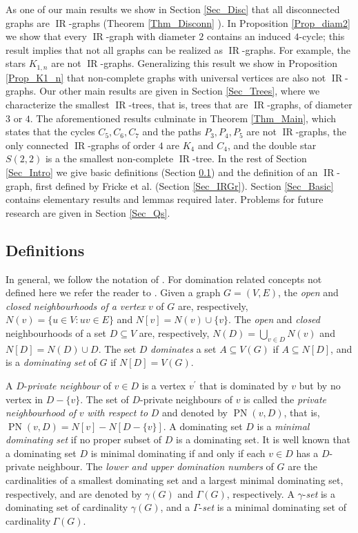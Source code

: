 \documentclass[12pt]{article}%
\begin{document}
As one of our main results we show in Section \ref{Sec_Disc} that all
disconnected graphs are $\operatorname{IR}$-graphs (Theorem \ref{Thm_Disconn}%
). In Proposition \ref{Prop_diam2} we show that every $\operatorname{IR}%
$-graph with diameter $2$ contains an induced $4$-cycle; this result implies
that not all graphs can be realized as $\operatorname{IR}$-graphs. For
example, the stars $K_{1,n}$ are not $\operatorname{IR}$-graphs. Generalizing
this result we show in Proposition \ref{Prop_K1_n} that non-complete graphs
with universal vertices are also not $\operatorname{IR}$-graphs. Our other
main results are given in Section \ref{Sec_Trees}, where we characterize the
smallest $\operatorname{IR}$-trees, that is, trees that are $\operatorname{IR}%
$-graphs, of diameter $3$ or $4$. The aforementioned results culminate in
Theorem \ref{Thm_Main}, which states that the cycles $C_{5},C_{6},C_{7}$ and
the paths $P_{3},P_{4},P_{5}$ are not $\operatorname{IR}$-graphs, the only
connected $\operatorname{IR}$-graphs of order $4$ are $K_{4}$ and $C_{4}$, and
the double star $S(2,2)$ is a the smallest non-complete $\operatorname{IR}%
$-tree. In the rest of Section \ref{Sec_Intro} we give basic definitions
(Section \ref{Sec_Defs}) and the definition of an $\operatorname{IR}$-graph,
first defined by Fricke et al. \cite{FHHH11} (Section \ref{Sec_IRGr}). Section
\ref{Sec_Basic} contains elementary results and lemmas required later.
Problems for future research are given in Section \ref{Sec_Qs}.

\subsection{Definitions}

\label{Sec_Defs}In general, we follow the notation of \cite{CLZ}. For
domination related concepts not defined here we refer the reader to
\cite{HHS}. Given a graph $G=(V,E)$, the \emph{open }and \emph{closed
neighbourhoods of a vertex }$v$ of $G$ are, respectively, $N(v)=\{u\in V:uv\in
E\}$ and $N[v]=N(v)\cup\{v\}$. The \emph{open }and \emph{closed }%
neighbourhoods of a set $D\subseteq V$ are, respectively, $N(D)=\bigcup_{v\in
D}N(v)$ and $N[D]=N(D)\cup D$. The set $D$ \emph{dominates} a set $A\subseteq
V(G)$ if $A\subseteq N[D]$, and is a \emph{dominating set }of $G$ if
$N[D]=V(G)$.

A $D$-\emph{private neighbour }of $v\in D$ is a vertex $v^{\prime}$ that is
dominated by $v$ but by no vertex in $D-\{v\}$. The set of $D$-private
neighbours of $v$ is called the \emph{private neighbourhood of }$v$ \emph{with
respect to }$D$ and denoted by $\operatorname{PN}(v,D)$, that is,
$\operatorname{PN}(v,D)=N[v]-N[D-\{v\}]$. A dominating set $D$ is a
\emph{minimal dominating set }if no proper subset of $D$ is a dominating set.
It is well known \cite[Theorem 1.1]{HHS} that a dominating set $D$ is minimal
dominating if and only if each $v\in D$ has a $D$-private neighbour. The
\emph{lower and upper domination numbers} of $G$ are the cardinalities of a
smallest dominating set and a largest minimal dominating set, respectively,
and are denoted by $\gamma(G)$ and $\Gamma(G)$, respectively. A $\gamma
$-\emph{set }is a dominating set of cardinality $\gamma(G)$, and a $\Gamma
$-\emph{set }is a minimal dominating set of cardinality$~\Gamma(G)$.
\end{document}
